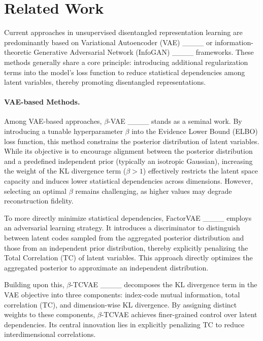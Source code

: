 \section{Related Work}
Current approaches in unsupervised disentangled representation learning are predominantly based on Variational Autoencoder (VAE) ____ or information-theoretic Generative Adversarial Network (InfoGAN) ____ frameworks. These methods generally share a core principle: introducing additional regularization terms into the model's loss function to reduce statistical dependencies among latent variables, thereby promoting disentangled representations.
\paragraph{VAE-based Methods.} Among VAE-based approaches, $\beta$-VAE ____ stands as a seminal work. By introducing a tunable hyperparameter $\beta$ into the Evidence Lower Bound (ELBO) loss function, this method constrains the posterior distribution of latent variables. While its objective is to encourage alignment between the posterior distribution and a predefined independent prior (typically an isotropic Gaussian), increasing the weight of the KL divergence term ($\beta > 1$) effectively restricts the latent space capacity and induces lower statistical dependencies across dimensions. However, selecting an optimal $\beta$ remains challenging, as higher values may degrade reconstruction fidelity. 

To more directly minimize statistical dependencies, FactorVAE ____ employs an adversarial learning strategy. It introduces a discriminator to distinguish between latent codes sampled from the aggregated posterior distribution and those from an independent prior distribution, thereby explicitly penalizing the Total Correlation (TC) of latent variables. This approach directly optimizes the aggregated posterior to approximate an independent distribution.

Building upon this, $\beta$-TCVAE ____ decomposes the KL divergence term in the VAE objective into three components: index-code mutual information, total correlation (TC), and dimension-wise KL divergence. By assigning distinct weights to these components, $\beta$-TCVAE achieves finer-grained control over latent dependencies. Its central innovation lies in explicitly penalizing TC to reduce interdimensional correlations.
